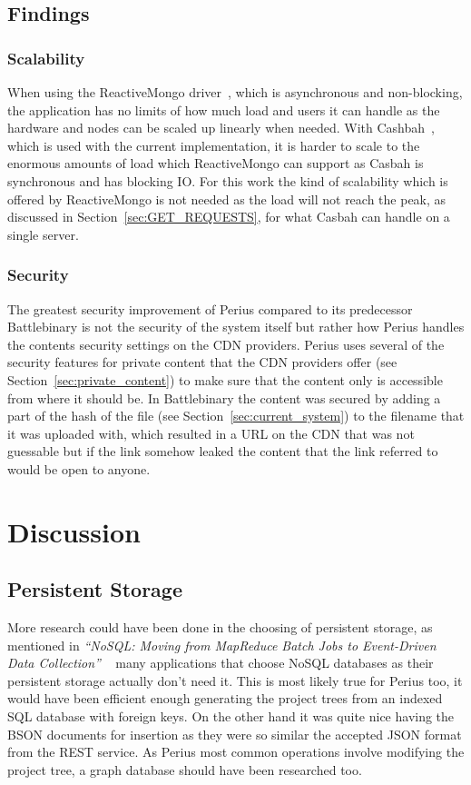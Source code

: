 \documentclass[a4paper,12pt]{article}
\begin{document}
\subsection{Findings}
\subsubsection{Scalability}
When using the ReactiveMongo driver~\cite{REACTIVEMONGO}, which is asynchronous and non-blocking, 
the application has no limits of how much load and users it can handle as the hardware and nodes 
can be scaled up linearly when needed. With Cashbah~\cite{CASBAH}, which is used with the current 
implementation, it is harder to scale to the enormous amounts of load which ReactiveMongo can 
support as Casbah is synchronous and has blocking IO. For this work the kind of scalability which 
is offered by ReactiveMongo is not needed as the load will not reach the peak, as discussed in 
Section~\ref{sec:GET_REQUESTS}, for what Casbah can handle on a single server. 

\subsubsection{Security}
The greatest security improvement of Perius compared to its predecessor Battlebinary is not the
security of the system itself but rather how Perius handles the contents security settings on the
CDN providers. Perius uses several of the security features for private content that the CDN
providers offer (see Section~\ref{sec:private_content}) to make sure that the content only is
accessible from where it should be. In Battlebinary the content was secured by adding a part of the
hash of the file (see Section~\ref{sec:current_system}) to the filename that it was uploaded with, 
which resulted in a URL on the CDN that was not guessable but if the link somehow leaked the 
content that the link referred to would be open to anyone.

\newpage
\section{Discussion}
\subsection{Persistent Storage}
More research could have been done in the choosing of persistent storage, as mentioned in 
\textit{``NoSQL: Moving from MapReduce Batch Jobs to Event-Driven Data Collection''}
~\cite{KLINGSBO} many applications that choose NoSQL databases as their persistent storage 
actually don't need it. This is most likely true for Perius too, it would have been efficient 
enough generating the project trees from an indexed SQL database with foreign keys. On the 
other hand it was quite nice having the BSON documents for insertion as they were so similar 
the accepted JSON format from the REST service. As Perius most common operations involve 
modifying the project tree, a graph database should have been researched too.
\end{document}
